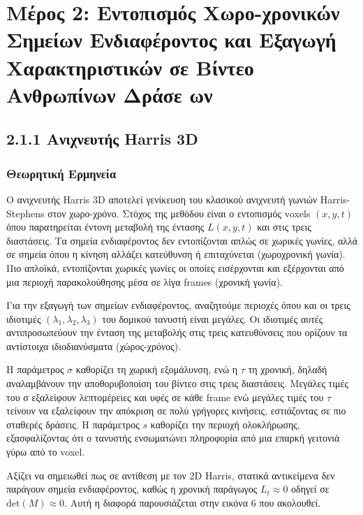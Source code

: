 \documentclass[12pt]{article}
\begin{document}
\setcounter{table}{3}

\section*{Μέρος 2: Εντοπισμός Χωρο-χρονικών Σημείων Ενδιαφέροντος
και Εξαγωγή Χαρακτηριστικών σε Βίντεο Ανθρωπίνων Δράσε
ων}

\subsection*{2.1.1 Ανιχνευτής Harris 3D}

\subsubsection*{Θεωρητική Ερμηνεία}
\hspace{0.6cm}Ο ανιχνευτής Harris 3D αποτελεί γενίκευση του κλασικού ανιχνευτή γωνιών Harris-Stephens στον χωρο-χρόνο. Στόχος της μεθόδου είναι ο εντοπισμός voxels $(x, y, t)$ όπου παρατηρείται έντονη μεταβολή της έντασης $L(x, y, t)$ και στις τρεις διαστάσεις. Τα σημεία ενδιαφέροντος δεν εντοπίζονται απλώς σε χωρικές γωνίες, αλλά σε σημεία όπου η κίνηση αλλάζει κατεύθυνση ή επιταχύνεται (χωροχρονική γωνία). Πιο απλοϊκά, εντοπίζονται χωρικές γωνίες οι οποίες εισέρχονται και εξέρχονται από μια περιοχή παρακολούθησης μέσα σε λίγα frames (χρονική γωνία).

Για την εξαγωγή των σημείων ενδιαφέροντος, αναζητούμε περιοχές όπου και οι τρεις ιδιοτιμές $(\lambda_1, \lambda_2, \lambda_3)$ του δομικού τανυστή είναι μεγάλες. Οι ιδιοτιμές αυτές αντιπροσωπεύουν την ένταση της μεταβολής στις τρεις κατευθύνσεις που ορίζουν τα αντίστοιχα ιδιοδιανύσματα (χώρος-χρόνος).


Η παράμετρος $\sigma$ καθορίζει τη χωρική εξομάλυνση, ενώ η $\tau$ τη χρονική, δηλαδή αναλαμβάνουν την αποθορυβοποίση του βίντεο στις τρεις διαστάσεις. Μεγάλες τιμές του σ εξαλείφουν λεπτομέρειες και υφές σε κάθε frame  ενώ μεγάλες τιμές του $\tau$ τείνουν να εξαλείφουν την απόκριση σε πολύ γρήγορες κινήσεις, εστιάζοντας σε πιο σταθερές δράσεις. Η παράμετρος $s$ καθορίζει την περιοχή ολοκλήρωσης, εξασφαλίζοντας ότι ο τανυστής ενσωματώνει πληροφορία από μια επαρκή γειτονιά γύρω από το voxel.

Αξίζει να σημειωθεί πως σε αντίθεση με τον 2D Harris, στατικά αντικείμενα δεν παράγουν σημεία ενδιαφέροντος, καθώς η χρονική παράγωγος $L_t \approx 0$ οδηγεί σε $\text{det}(M) \approx 0$. Αυτή η διαφορά παρουσιάζεται στην εικόνα 6 που ακολουθεί.
\end{document}

